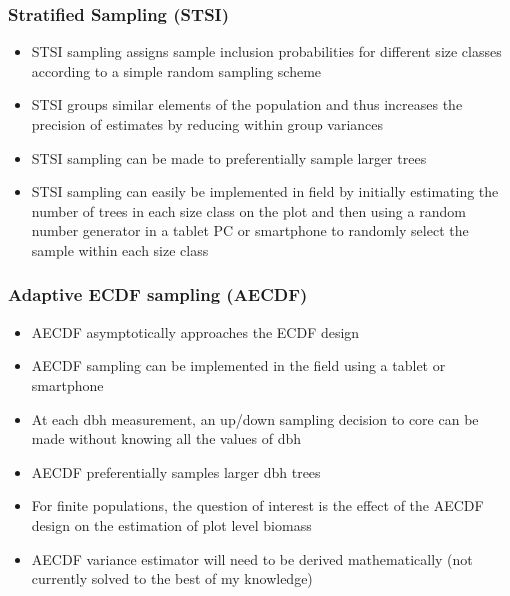 \documentclass{beamer}
\begin{document}
\begin{frame}
  \frametitle{Stratified Sampling (STSI)}
  \begin{itemize}
    \item STSI sampling assigns sample inclusion probabilities for different size classes according to a simple random sampling scheme \vspace{3mm}
    \item STSI groups similar elements of the population and thus increases the precision of estimates by reducing within group variances \vspace{3mm}
    \item STSI sampling can be made to preferentially sample larger trees \vspace{3mm}
    \item STSI sampling can easily be implemented in field by initially estimating the number of trees in each size class on the plot and then using a random number generator in a tablet PC or smartphone to randomly select the sample within each size class \vspace{3mm}
  \end{itemize}
\end{frame} 
%
\begin{frame}
  \frametitle{Adaptive ECDF sampling (AECDF)}
  \begin{itemize}
    \item AECDF asymptotically approaches the ECDF design \vspace{3mm}
    \item AECDF sampling can be implemented in the field using a tablet or smartphone \vspace{3mm}
    \item At each dbh measurement, an up/down sampling decision to core can be made without knowing all the values of dbh \vspace{3mm}
    \item AECDF preferentially samples larger dbh trees \vspace{3mm}
    \item For finite populations, the question of interest is the effect of the AECDF design on the estimation of plot level biomass \vspace{3mm}
    \item AECDF variance estimator will need to be derived mathematically (not currently solved to the best of my knowledge)
  \end{itemize}
\end{frame}
%
\end{document}
